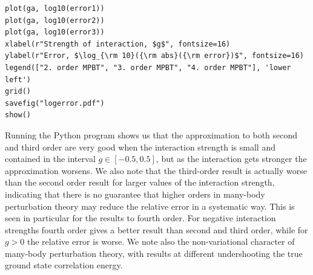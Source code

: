 \documentclass[%
twoside,                 %
final,                   %
10pt]{article}
\newenvironment{doconceexercise}{}{}
\begin{document}
\begin{doconceexercise}
\begin{verbatim}
plot(ga, log10(error1))
plot(ga, log10(error2))
plot(ga, log10(error3))
xlabel(r"Strength of interaction, $g$", fontsize=16)
ylabel(r"Error, $\log_{\rm 10}({\rm abs}({\rm error})$", fontsize=16)
legend(["2. order MPBT", "3. order MPBT", "4. order MPBT"], 'lower left')
grid()
savefig("logerror.pdf")
show()
\end{verbatim}
Running the Python program shows us that
the approximation to both second and third order are very
good when the interaction strength is small and contained in the interval  
$g\in[-0.5,0.5]$, but as the
interaction gets stronger the approximation worsens. We also
note that the third-order result is actually worse than the second order result 
for larger values of the interaction strength, indicating that there is no guarantee that higher orders
in many-body perturbation theory may reduce the relative error in a systematic way.
This is seen in particular for the results to fourth order. For negative interaction strengths 
fourth order gives a better result than second and third order, while for $g>0$ the relative error is 
worse.
We note also the non-variational character of many-body perturbation theory, with results at different undershooting the true ground state correlation energy.


\end{doconceexercise}
\end{document}
